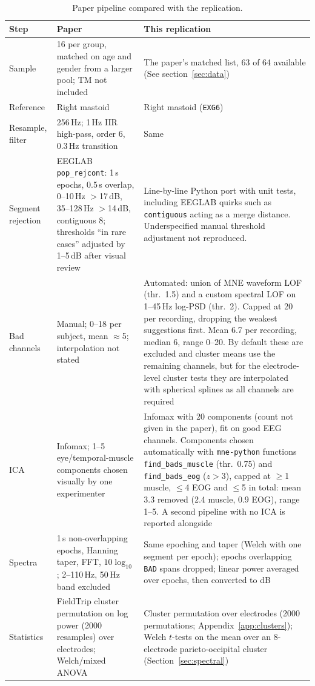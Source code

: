 \documentclass[10pt,a4paper]{article}
\begin{document}
\begin{table}[h]
\centering\small
\begin{tabular}{@{}p{2.6cm}p{6.2cm}p{6.6cm}@{}}
\toprule
Step & Paper & This replication \\
\midrule
Sample & 16 per group, matched on age and gender from a larger pool; TM not included &
  The paper's matched list, 63 of 64 available (See section~\ref{sec:data}) \\
Reference & Right mastoid & Right mastoid (\texttt{EXG6}) \\
Resample, filter & 256\,Hz; 1\,Hz IIR high-pass, order 6, 0.3\,Hz transition & Same \\
Segment rejection & EEGLAB \texttt{pop\_rejcont}: 1\,s epochs, 0.5\,s overlap, 0--10\,Hz $>$17\,dB, 35--128\,Hz $>$14\,dB, contiguous 8;
  thresholds ``in rare cases'' adjusted by 1--5\,dB after visual review &
  Line-by-line Python port with unit tests, including EEGLAB quirks such as \texttt{contiguous} acting as a merge distance.
  Underspecified manual threshold adjustment not reproduced. \\
Bad channels & Manual; 0--18 per subject, mean $\approx$5; interpolation not stated &
  Automated: union of MNE waveform LOF (thr.\ 1.5) and a custom spectral LOF on 1--45\,Hz log-PSD (thr.\ 2).
  Capped at 20 per recording, dropping the weakest suggestions first.
  Mean 6.7 per recording, median 6, range 0--20. By default these are excluded and cluster means use the 
  remaining channels, but for the electrode-level cluster tests
  they are interpolated with spherical splines as all channels are required    \\
ICA & Infomax; 1--5 eye/temporal-muscle components chosen visually by one experimenter &
  Infomax with 20 components (count not given in the paper), fit on good EEG channels.
  Components chosen automatically with \texttt{mne-python} functions \texttt{find\_bads\_muscle} (thr.\ 0.75) and \texttt{find\_bads\_eog} ($z{>}3$),
  capped at $\ge$1 muscle, $\le$4 EOG and $\le$5 in total: mean 3.3 removed (2.4 muscle, 0.9 EOG), range 1--5.
  A second pipeline with no ICA is reported alongside \\
Spectra & 1\,s non-overlapping epochs, Hanning taper, FFT, $10\log_{10}$; 2--110\,Hz, 50\,Hz band excluded &
  Same epoching and taper (Welch with one segment per epoch); epochs overlapping \texttt{BAD} spans dropped;
  linear power averaged over epochs, then converted to dB \\
Statistics & FieldTrip cluster permutation on log power (2000 resamples) over electrodes; Welch/mixed ANOVA &
  Cluster permutation over electrodes (2000 permutations; Appendix~\ref{app:clusters}); Welch $t$-tests on the
  mean over an 8-electrode parieto-occipital cluster (Section~\ref{sec:spectral}) \\
\bottomrule
\end{tabular}
\caption{Paper pipeline compared with the replication.}
\label{tab:pipeline}
\end{table}
\end{document}

